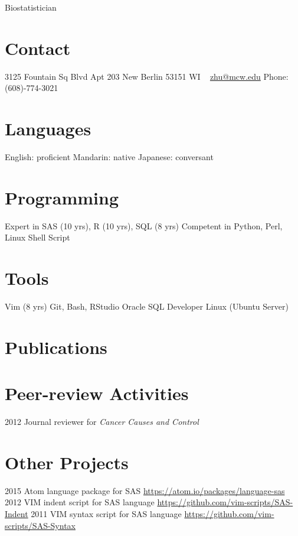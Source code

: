 \documentclass[11pt, print]{friggeri-cv}
\begin{document}
       {Biostatistician}

\begin{aside}
  \section{Contact}
    3125 Fountain Sq Blvd
    Apt 203
    New Berlin
    53151 WI
    ~
    \href{mailto:zhu@mcw.edu}{zhu@mcw.edu}
    Phone: (608)-774-3021
  \section{Languages}
    English: proficient
    Mandarin: native
    Japanese: conversant
  \section{Programming}
    Expert in SAS (10 yrs),
    R (10 yrs), SQL (8 yrs)
    Competent in Python,
    Perl, Linux Shell Script
  \section{Tools}
    Vim (8 yrs)
    Git, Bash, RStudio
    Oracle SQL Developer
    Linux (Ubuntu Server)
\end{aside}




\section{Publications}


\section{Peer-review Activities}

\begin{entrylist}
  \simpleentry
    {2012}
    {Journal reviewer for \textit{Cancer Causes and Control}}
    {}
\end{entrylist}

\section{Other Projects}

\begin{entrylist}
  \simpleentry
    {2015}
    {Atom language package for SAS}
    {\href{https://atom.io/packages/language-sas}{https://atom.io/packages/language-sas}}
  \simpleentry
    {2012}
    {VIM indent script for SAS language}
    {\href{https://github.com/vim-scripts/SAS-Indent}{https://github.com/vim-scripts/SAS-Indent}}
  \simpleentry
    {2011}
    {VIM syntax script for SAS language}
    {\href{https://github.com/vim-scripts/SAS-Syntax}{https://github.com/vim-scripts/SAS-Syntax}}
\end{entrylist}
\end{document}
